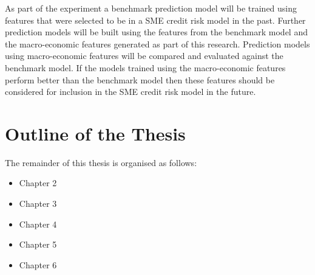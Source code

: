 As part of the experiment a benchmark prediction model will be trained using features that were selected to be in a SME credit risk model in the past. Further prediction models will be built using the features from the benchmark model and the macro-economic features generated as part of this research. Prediction models using macro-economic features will be compared and evaluated against the benchmark model. If the models trained using the  macro-economic features perform better than the benchmark model then these features should be considered for inclusion in the SME credit risk model in the future. 



\section{Outline of the Thesis}
The remainder of this thesis is organised as follows:

\begin{itemize}
	\item Chapter 2
	\item Chapter 3
	\item Chapter 4
	\item Chapter 5
	\item Chapter 6
\end{itemize}

